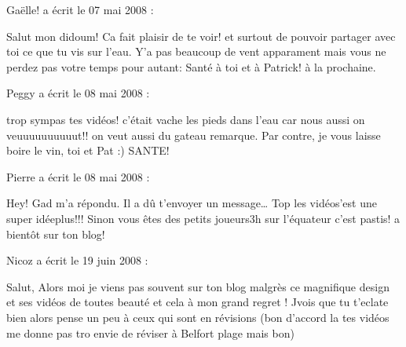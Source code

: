 \medskip
Gaëlle! a écrit le 07 mai 2008 :
\begin{displayquote}
Salut mon didoum!
Ca fait plaisir de te voir! et surtout de pouvoir partager avec toi ce que tu vis sur l'eau.
Y'a pas beaucoup de vent apparament mais vous ne perdez pas votre temps pour autant: Santé à toi et à Patrick!
à la prochaine.
\end{displayquote}

\medskip
Peggy a écrit le 08 mai 2008 :
\begin{displayquote}
trop sympas tes vidéos!
c'était vache les pieds dans l'eau car nous aussi on veuuuuuuuuuut!! on veut aussi du gateau remarque.
Par contre, je vous laisse boire le vin, toi et Pat :) SANTE!
\end{displayquote}

\medskip
Pierre a écrit le 08 mai 2008 :
\begin{displayquote}
Hey!
Gad m'a répondu. Il a dû t'envoyer un message\dots
Top les vidéos\dotsc'est une super idée\dotsfaisant plus!!!
Sinon vous êtes des petits joueurs 3h sur l'équateur c'est pastis!
a bientôt sur ton blog!
\end{displayquote}

\medskip
Nicoz a écrit le 19 juin 2008 :
\begin{displayquote}
Salut,
Alors moi je viens pas souvent sur ton blog malgrès ce magnifique design et ses vidéos de toutes beauté et cela à mon grand regret !
Jvois que tu t'eclate bien alors pense un peu à ceux qui sont en révisions (bon d'accord la tes vidéos me donne pas tro envie de réviser à Belfort plage mais bon)
\end{displayquote}

\vfill
